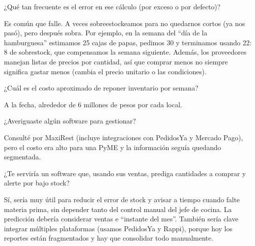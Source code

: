 \begin{description}[leftmargin=0cm, labelsep=0.5cm]
  \item[\textbf{Entrevistador:}] ¿Qué tan frecuente es el error en ese cálculo (por exceso o por defecto)?

  \item[\textbf{Ulises Litterio:}] Es común que falle. A veces sobreestockeamos para no quedarnos cortos (ya nos pasó), pero después sobra. Por ejemplo, en la semana del “día de la hamburguesa” estimamos 25 cajas de papas, pedimos 30 y terminamos usando 22: 8 de sobrestock, que compensamos la semana siguiente. Además, los proveedores manejan listas de precios por cantidad, así que comprar menos no siempre significa gastar menos (cambia el precio unitario o las condiciones).

  \item[\textbf{Entrevistador:}] ¿Cuál es el costo aproximado de reponer inventario por semana?

  \item[\textbf{Ulises Litterio:}] A la fecha, alrededor de 6 millones de pesos por cada local.

  \item[\textbf{Entrevistador:}] ¿Averiguaste algún software para gestionar?

  \item[\textbf{Ulises Litterio:}] Consulté por MaxiRest (incluye integraciones con PedidosYa y Mercado Pago), pero el costo era alto para una PyME y la información seguía quedando segmentada.

  \item[\textbf{Entrevistador:}] ¿Te serviría un software que, usando sus ventas, prediga cantidades a comprar y alerte por bajo stock?

  \item[\textbf{Ulises Litterio:}] Sí, sería muy útil para reducir el error de stock y avisar a tiempo cuando falte materia prima, sin depender tanto del control manual del jefe de cocina. La predicción debería considerar ventas e “instante del mes”. También sería clave integrar múltiples plataformas (usamos PedidosYa y Rappi), porque hoy los reportes están fragmentados y hay que consolidar todo manualmente.

\end{description}


